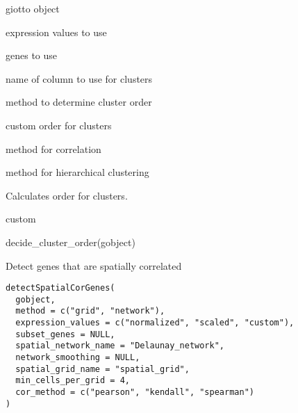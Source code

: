 \documentclass[a4paper]{book}
\begin{document}
%
\begin{Arguments}
\begin{ldescription}
\item[\code{gobject}] giotto object

\item[\code{expression\_values}] expression values to use

\item[\code{genes}] genes to use

\item[\code{cluster\_column}] name of column to use for clusters

\item[\code{cluster\_order}] method to determine cluster order

\item[\code{cluster\_custom\_order}] custom order for clusters

\item[\code{cor\_method}] method for correlation

\item[\code{hclust\_method}] method for hierarchical clustering
\end{ldescription}
\end{Arguments}
%
\begin{Details}\relax
Calculates order for clusters.
\end{Details}
%
\begin{Value}
custom
\end{Value}
%
\begin{Examples}
\begin{ExampleCode}
    decide_cluster_order(gobject)
\end{ExampleCode}
\end{Examples}
%
\begin{Description}\relax
Detect genes that are spatially correlated
\end{Description}
%
\begin{Usage}
\begin{verbatim}
detectSpatialCorGenes(
  gobject,
  method = c("grid", "network"),
  expression_values = c("normalized", "scaled", "custom"),
  subset_genes = NULL,
  spatial_network_name = "Delaunay_network",
  network_smoothing = NULL,
  spatial_grid_name = "spatial_grid",
  min_cells_per_grid = 4,
  cor_method = c("pearson", "kendall", "spearman")
)
\end{verbatim}
\end{Usage}
\end{document}
